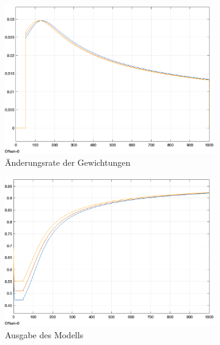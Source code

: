 \begin{figure}[h]
  \centering
  \begin{subfigure}[b]{0.3\textwidth}
    \includegraphics[width=\textwidth]{abbildungen/c_ep_convergence_weight_update.png}
    \caption{Änderungsrate der Gewichtungen}
  \end{subfigure}%
  \hfill
  \begin{subfigure}[b]{0.3\textwidth}
    \includegraphics[width=\textwidth]{abbildungen/c_ep_convergence_ausgabe.png}
    \caption{Ausgabe des Modells}
  \end{subfigure}%
  \hfill
  \begin{subfigure}[b]{0.3\textwidth}

\end{subfigure}
\end{figure}
